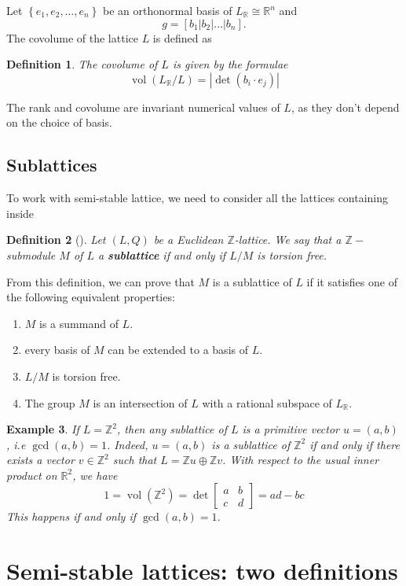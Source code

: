 \documentclass[12pt]{article} %
\newtheorem{definition}{Definition}[section]
\newtheorem{example}[definition]{Example}
\DeclareMathOperator{\vol}{vol}
\newcommand{\tpoint}[1]{\subsection{#1}}
\begin{document}
Let $\left\lbrace e_1,e_2,\ldots,e_n \right\rbrace$ be an orthonormal basis of $L_\mathbb{R} \cong \mathbb{R}^n$ and
\[g = [b_1 | b_2 | \ldots | b_n] .\] The covolume of the lattice
$L$ is defined as
\begin{definition}
    The covolume of $L$ is given by the formulae
    \[\vol(L_\mathbb{R}/L) = \left|\det(b_i\cdot e_j)\right|\]
\end{definition}
The rank and covolume are invariant numerical values of $L$, as they don't depend on the choice of basis. 
\tpoint{Sublattices}
To work with semi-stable lattice, we need to consider all the lattices containing inside
\begin{definition}[\label=sublattice]
    Let $(L,Q)$ be a Euclidean $\mathbb{Z}$-lattice. We say that a $\mathbb{Z}-$submodule $M$ of
    $L$ a \textbf{sublattice} if and only if $L/M$ is torsion free.
\end{definition}
From this definition, we can prove that $M$ is a sublattice of $L$ if it satisfies one of the
following equivalent properties:
\begin{enumerate}
    \item $M$ is a summand of $L$.
    \item every basis of $M$ can be extended to a basis of $L$.
    \item $L/M$ is torsion free.
    \item The group $M$ is an intersection of $L$ with a rational subspace of $L_\mathbb{R}$.
\end{enumerate}
\begin{example}
    If $L = \mathbb{Z}^2$, then any sublattice of $L$ is a primitive vector $u = (a,b)$, i.e
    $\gcd(a,b)=1$. Indeed, $u=(a,b)$ is a sublattice of $\mathbb{Z}^2$ if and only if there exists a vector $v \in \mathbb{Z}^2$
    such that $L = \mathbb{Z}u \oplus \mathbb{Z}v$. With respect to the usual inner product on $\mathbb{R}^2$,
    we have
    \[1 = \vol(\mathbb{Z}^2) = \det \begin{bmatrix}
            a & b \\
            c & d
        \end{bmatrix} = ad-bc\]
    This happens if and only if $\gcd(a,b)=1$.
\end{example}
\section{Semi-stable lattices: two definitions}
\end{document}
